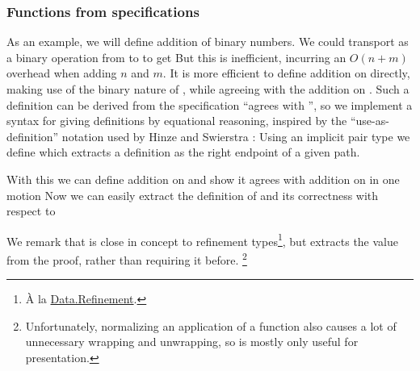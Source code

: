 \subsubsection{Functions from specifications}\label{ssec:useas}
As an example, we will define addition of binary numbers. We could transport \AgdaFunction{\_+\_} as a binary operation
from \bN to \bL to get
But this is inefficient, incurring an $O(n + m)$ overhead when adding $n$ and $m$. It is more efficient to define addition on \bL{} directly, making use of the binary nature of \bL{}, while agreeing with the addition on \bN{}. Such a definition can be derived from the specification ``agrees with \AgdaFunction{\_+\_}'', so we implement a syntax for giving definitions by equational reasoning, inspired by the ``use-as-definition'' notation used by Hinze and Swierstra \cite{calcdata}: Using an implicit pair type
we define
which extracts a definition as the right endpoint of a given path.

With this we can define addition on \bL{} and show it agrees with addition on \bN{} in one motion
Now we can easily extract the definition of  and its correctness with respect to \AgdaFunction{\_+\_} 

We remark that  is close in concept to refinement types\footnote{À la \href{https://agda.github.io/agda-stdlib/Data.Refinement.html}{Data.Refinement}.}, but extracts the value from the proof, rather than requiring it before. \footnote{Unfortunately, normalizing an application of a  function also causes a lot of unnecessary wrapping and unwrapping, so  is mostly only useful for presentation.} %


